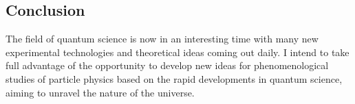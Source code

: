 \documentclass[12pt]{article}
\begin{document}
\subsection*{Conclusion}

The field of quantum science is now in an interesting time with many new experimental technologies and theoretical ideas coming out daily.
I intend to take full advantage of the opportunity to develop new ideas for phenomenological studies of particle physics based on the rapid developments in quantum science, aiming to unravel the nature of the universe.



\end{document}
